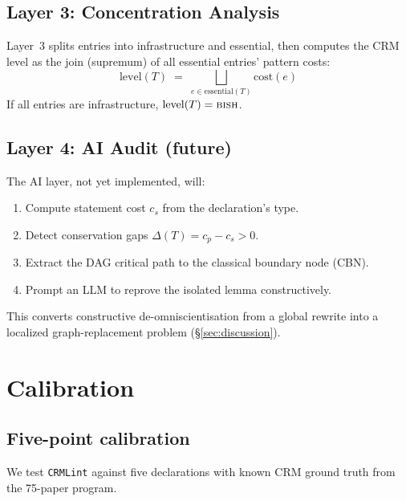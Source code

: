 \documentclass[12pt, a4paper]{article}
\theoremstyle{plain}
\theoremstyle{definition}
\theoremstyle{remark}
\newcommand{\BISH}{\textsc{bish}}
\newcommand{\CRMLint}{\texttt{CRMLint}}
\begin{document}
\subsection{Layer 3: Concentration Analysis}

Layer~3 splits entries into infrastructure and essential, then
computes the CRM level as the join (supremum) of all essential
entries' pattern costs:
\[
  \mathrm{level}(T) \;=\; \bigsqcup_{e \in \mathrm{essential}(T)} \mathrm{cost}(e)
\]
If all entries are infrastructure, $\mathrm{level}(T) = \BISH$.

\subsection{Layer 4: AI Audit (future)}

The AI layer, not yet implemented, will:
\begin{enumerate}[nosep]
\item Compute statement cost $c_s$ from the declaration's type.
\item Detect conservation gaps $\Delta(T) = c_p - c_s > 0$.
\item Extract the DAG critical path to the classical boundary node (CBN).
\item Prompt an LLM to reprove the isolated lemma constructively.
\end{enumerate}
This converts constructive de-omniscientisation from a global rewrite
into a localized graph-replacement problem (\S\ref{sec:discussion}).


\section{Calibration}\label{sec:calibration}

\subsection{Five-point calibration}

We test \CRMLint{} against five declarations with known CRM ground
truth from the 75-paper program.
\end{document}
